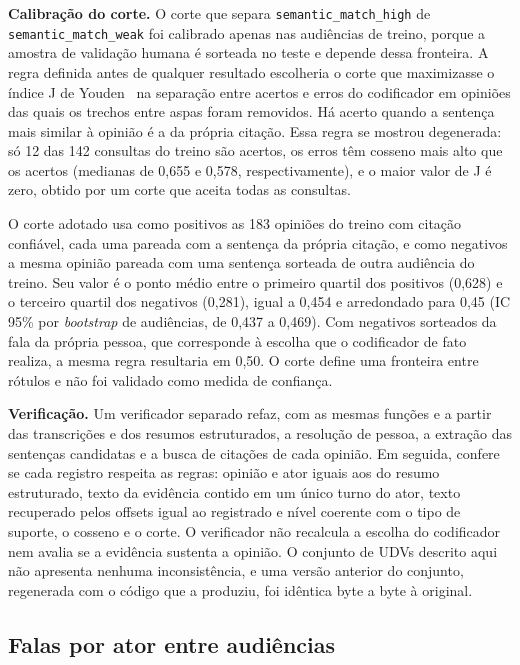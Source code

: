

\textbf{Calibração do corte.} O corte que separa \texttt{semantic\_match\_high} de
\texttt{semantic\_match\_weak} foi calibrado apenas nas audiências de treino, porque a amostra de
validação humana é sorteada no teste e depende dessa fronteira. A regra definida antes de qualquer
resultado escolheria o corte que maximizasse o índice J de Youden~\citep{youden1950index} na separação entre acertos e erros
do codificador em opiniões das quais os trechos entre aspas foram removidos. Há acerto quando a
sentença mais similar à opinião é a da própria citação. Essa regra se mostrou
degenerada: só 12 das 142 consultas do treino são acertos, os erros têm cosseno mais alto que os
acertos (medianas de 0,655 e 0,578, respectivamente), e o maior valor de J é zero, obtido por um
corte que aceita todas as consultas.

O corte adotado usa como positivos as 183 opiniões do treino com citação confiável, cada uma pareada
com a sentença da própria citação, e como negativos a mesma opinião pareada com uma sentença sorteada
de outra audiência do treino. Seu valor é o ponto médio entre o primeiro quartil dos positivos
(0,628) e o terceiro quartil dos negativos (0,281), igual a 0,454 e arredondado para 0,45 (IC 95\%
por \textit{bootstrap} de audiências, de 0,437 a 0,469). Com negativos sorteados da fala da própria
pessoa, que corresponde à escolha que o codificador de fato realiza, a mesma regra resultaria em
0,50. O corte define uma fronteira entre rótulos e não foi validado como medida de confiança.

\textbf{Verificação.} Um verificador separado refaz, com as mesmas funções e a partir das transcrições e dos resumos
estruturados, a
resolução de pessoa, a extração das sentenças candidatas e a busca de citações de cada opinião. Em
seguida, confere se cada registro respeita as regras: opinião e ator iguais aos do resumo estruturado, texto da
evidência contido em um único turno do ator, texto recuperado pelos offsets igual ao registrado e
nível coerente com o tipo de suporte, o cosseno e o corte. O verificador não recalcula a escolha do
codificador nem avalia se a evidência sustenta a opinião. O conjunto de UDVs descrito aqui não
apresenta nenhuma inconsistência, e uma versão anterior do conjunto, regenerada com o código que a
produziu, foi idêntica byte a byte à original.

\subsection{Falas por ator entre audiências}
\label{sec:metodo-atores}

